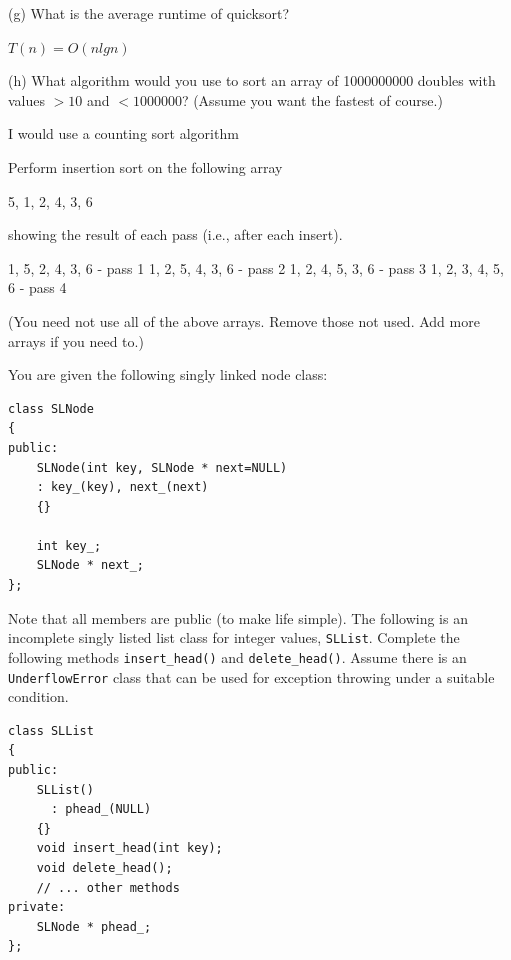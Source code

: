 (g)
What is the average runtime of quicksort?
\\
\ANSWER
\begin{answerlong}
$T(n) = O(nlgn)$
\end{answerlong}
  
(h)
What algorithm would you use to sort an array of 1000000000 doubles
with values $> 10$ and $< 1000000$?
(Assume you want the fastest of course.)
\\
\ANSWER
\begin{answerlong}
I would use a counting sort algorithm
\end{answerlong}
 
\newpage
\nextq %
Perform insertion sort on the following array
\begin{console}
{5, 1, 2, 4, 3, 6}
\end{console}
showing the result of each pass (i.e., after each insert).
\\
\ANSWER
\begin{answercode}
{1, 5, 2, 4, 3, 6} - pass 1
{1, 2, 5, 4, 3, 6} - pass 2
{1, 2, 4, 5, 3, 6} - pass 3
{1, 2, 3, 4, 5, 6} - pass 4
\end{answercode}
(You need not use all of the above arrays. Remove those not used.
Add more arrays if you need to.)

\newpage
\nextq
You are given the following singly linked node class:
\vspace{-3mm}
\begin{Verbatim}[frame=single,fontsize=\small]
class SLNode
{
public:
    SLNode(int key, SLNode * next=NULL)
    : key_(key), next_(next)
    {}
    
    int key_;
    SLNode * next_;
};
\end{Verbatim}
\vspace{-4mm}
Note that all members are public (to make life simple).
The following is an incomplete singly listed list class for integer
values,
\verb!SLList!.
Complete the following methods \verb!insert_head()! and \verb!delete_head()!.
Assume there is an \verb!UnderflowError! class that can be used for exception
throwing under a suitable condition.
\vspace{-3mm}
\begin{Verbatim}[frame=single,fontsize=\small]
class SLList
{
public:
    SLList()
      : phead_(NULL)
    {}
    void insert_head(int key);
    void delete_head();
    // ... other methods
private:
    SLNode * phead_;
};
\end{Verbatim}

